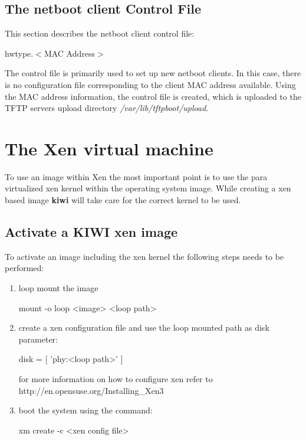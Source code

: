 
\subsection{The netboot client Control File}
\label{section:cntrlhw}
This section describes the netboot client control file:

\begin{Command}{8cm}
hwtype.$<$MAC Address$>$
\end{Command}

The control file is primarily used to set up new netboot clients. In this
case, there is no configuration file corresponding to the client
MAC address available. Using the MAC address information, the control file
is created, which is uploaded to the TFTP servers upload directory
\textit{/var/lib/tftpboot/upload}.

\section{The Xen virtual machine}
To use an image within Xen the most important point is to use
the para virtualized xen kernel within the operating system image.
While creating a xen based image \textbf{kiwi} will take care
for the correct kernel to be used.

\subsection{Activate a KIWI xen image}
To activate an image including the xen kernel the following steps
needs to be performed:

\begin{enumerate}
	\item loop mount the image
       
          \begin{Command}{9cm}
          mount -o loop <image> <loop path>
          \end{Command}       

	\item create a xen configuration file and use the loop mounted
          path as disk parameter:

          \begin{Command}{9cm}
          disk = [ 'phy:<loop path>' ]
          \end{Command}
          
          for more information on how to configure xen refer to\\
          http://en.opensuse.org/Installing\_Xen3
	\item boot the system using the command:

          \begin{Command}{9cm}
          xm create -c <xen config file>
          \end{Command}
\end{enumerate}

